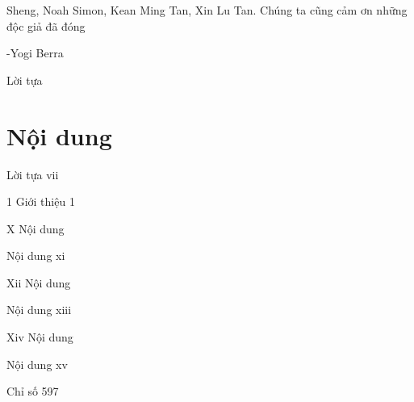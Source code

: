 Sheng, Noah Simon, Kean Ming Tan, Xin Lu Tan. Chúng ta cũng cảm ơn những độc giả đã đóng

-Yogi Berra

Lời tựa

\section{Nội dung}

Lời tựa vii

1 Giới thiệu 1

X Nội dung

Nội dung xi

Xii Nội dung

Nội dung xiii

Xiv Nội dung

Nội dung xv

Chỉ số 597

